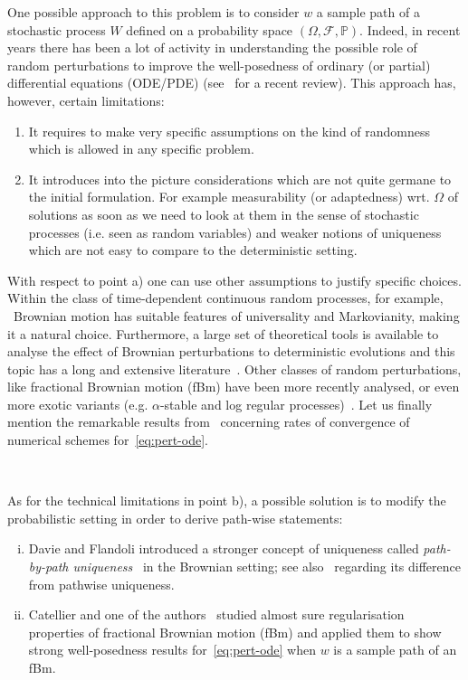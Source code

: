 \documentclass[10pt]{article}
\newcommand{\tmtextit}[1]{{\itshape{#1}}}
\newenvironment{enumeratealpha}{\begin{enumerate}[a{\textup{)}}] }{\end{enumerate}}
\newenvironment{enumerateroman}{\begin{enumerate}[i.] }{\end{enumerate}}
\begin{document}
One possible approach to this problem is to consider $w$ a sample path of a
stochastic process $W$ defined on a probability space $(\Omega, \mathcal{F},
\mathbb{P})$. Indeed, in recent years there has been a lot of activity in
understanding the possible role of random perturbations to improve the
well-posedness of ordinary (or partial) differential equations (ODE/PDE)
(see~{\cite{flandoli}} for a recent review). This approach has, however,
certain limitations:
\begin{enumeratealpha}
  \item It requires to make very specific assumptions on the kind of
  randomness which is allowed in any specific problem.
  
  \item It introduces into the picture considerations which are not quite
  germane to the initial formulation. For example measurability (or
  adaptedness) wrt. $\Omega$ of solutions as soon as we need to look at them
  in the sense of stochastic processes (i.e. seen as random variables) and
  weaker notions of uniqueness which are not easy to compare to the
  deterministic setting.
\end{enumeratealpha}
With respect to point a) one can use other assumptions to justify specific
choices. Within the class of time-dependent continuous random processes, for
example, \ Brownian motion has suitable features of universality and
Markovianity, making it a natural choice. Furthermore, a large set of
theoretical tools is available to analyse the effect of Brownian perturbations
to deterministic evolutions and this topic has a long and extensive
literature~{\cite{BFGM,dapratoflandoli,DFRV,FGP,krylov,veretennikov,zvonkin}}.
Other classes of random perturbations, like fractional Brownian motion (fBm)
have been more recently analysed, or even more exotic variants (e.g.
$\alpha$-stable and log regular
processes)~{\cite{banosproske,banos2019,le,nualartouknine,priola2012,priola2020}}.
Let us finally mention the remarkable results from~{\cite{butkovsky2019}}
concerning rates of convergence of numerical schemes
for~{\eqref{eq:pert-ode}}.

\

As for the technical limitations in point b), a possible solution is to
modify the probabilistic setting in order to derive path-wise statements:
\begin{enumerateroman}
  \item Davie and Flandoli introduced a stronger concept of uniqueness called
  \tmtextit{path-by-path uniqueness}~{\cite{davie,flandoli,flandoli2011}} in
  the Brownian setting; see also~{\cite{shaposhnikov2020}} regarding its
  difference from pathwise uniqueness.
  
  \item Catellier and one of the authors~{\cite{catelliergubinelli}} studied
  almost sure regularisation properties of fractional Brownian motion (fBm)
  and applied them to show strong well-posedness results
  for~{\eqref{eq:pert-ode}} when $w$ is a sample path of an fBm.
\end{enumerateroman}
\end{document}
